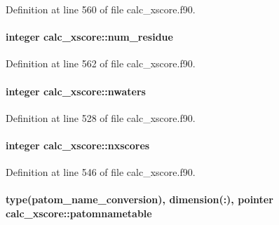 Definition at line 560 of file calc\-\_\-xscore.\-f90.

\hypertarget{classcalc__xscore_a2d2ea6c3fafbca8b3d22793de798f4c6}{
\paragraph[{num\-\_\-residue}]{\setlength{\rightskip}{0pt plus 5cm}integer calc\-\_\-xscore\-::num\-\_\-residue}}\label{classcalc__xscore_a2d2ea6c3fafbca8b3d22793de798f4c6}


Definition at line 562 of file calc\-\_\-xscore.\-f90.

\hypertarget{classcalc__xscore_a972331c36facee43ec17c9fbe6f1d176}{
\paragraph[{nwaters}]{\setlength{\rightskip}{0pt plus 5cm}integer calc\-\_\-xscore\-::nwaters}}\label{classcalc__xscore_a972331c36facee43ec17c9fbe6f1d176}


Definition at line 528 of file calc\-\_\-xscore.\-f90.

\hypertarget{classcalc__xscore_a4a8a5bc66c708de615c133b0ed418d5c}{
\paragraph[{nxscores}]{\setlength{\rightskip}{0pt plus 5cm}integer calc\-\_\-xscore\-::nxscores}}\label{classcalc__xscore_a4a8a5bc66c708de615c133b0ed418d5c}


Definition at line 546 of file calc\-\_\-xscore.\-f90.

\hypertarget{classcalc__xscore_a3366266413b9e1863715b562d6597fbd}{
\paragraph[{patomnametable}]{\setlength{\rightskip}{0pt plus 5cm}type({\bf patom\-\_\-name\-\_\-conversion}), dimension(\-:), pointer calc\-\_\-xscore\-::patomnametable}}\label{classcalc__xscore_a3366266413b9e1863715b562d6597fbd}


